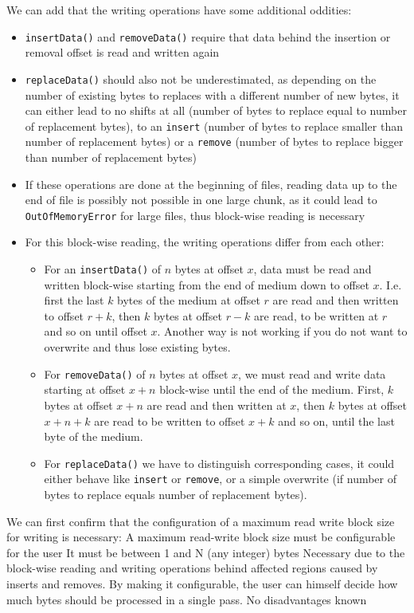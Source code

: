 We can add that the writing operations have some additional oddities:
\begin{itemize}
\item \texttt{insertData()} and \texttt{removeData()} require that data behind the insertion or removal offset is read and written again
\item \texttt{replaceData()} should also not be underestimated, as depending on the number of existing bytes to replaces with a different number of new bytes, it can either lead to no shifts at all (number of bytes to replace equal to number of replacement bytes), to an \texttt{insert} (number of bytes to replace smaller than number of replacement bytes) or a \texttt{remove} (number of bytes to replace bigger than number of replacement bytes)
\item If these operations are done at the beginning of files, reading data up to the end of file is possibly not possible in one large chunk, as it could lead to \texttt{OutOfMemoryError} for large files, thus block-wise reading is necessary
\item For this block-wise reading, the writing operations differ from each other:
\begin{itemize}
\item For an \texttt{insertData()} of $n$ bytes at offset $x$, data must be read and written block-wise starting from the end of medium down to offset $x$. I.e. first the last $k$ bytes of the medium at offset $r$ are read and then written to offset $r+k$, then $k$ bytes at offset $r-k$ are read, to be written at $r$ and so on until offset $x$. Another way is not working if you do not want to overwrite and thus lose existing bytes.
\item For \texttt{removeData()} of $n$ bytes at offset $x$, we must read and write data starting at offset $x+n$ block-wise until the end of the medium. First, $k$ bytes at offset $x+n$ are read and then written at $x$, then $k$ bytes at offset $x+n+k$ are read to be written to offset $x+k$ and so on, until the last byte of the medium.
\item For \texttt{replaceData()} we have to distinguish corresponding cases, it could either behave like \texttt{insert} or \texttt{remove}, or a simple overwrite (if number of bytes to replace equals number of replacement bytes).
\end{itemize}
\end{itemize}

We can first confirm that the configuration of a maximum read write block size for writing is necessary:
{%
A maximum read-write block size must be configurable for the user
}
{%
It must be between 1 and N (any integer) bytes
}
{%
Necessary due to the block-wise reading and writing operations behind affected regions caused by inserts and removes. By making it configurable, the user can himself decide how much bytes should be processed in a single pass.
}
{%
No disadvantages known
}

